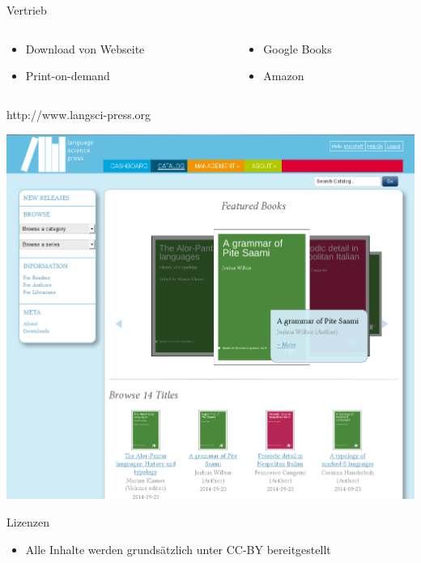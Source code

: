 \documentclass[final]{beamer}
\begin{document}
\begin{frame}{}
\begin{columns}[t]
\begin{column}{.45\linewidth}
    \begin{block}{Vertrieb}
      \begin{columns}
\begin{column}{.48\textwidth}
      \begin{itemize}
      \item Download von Webseite 
      \item Print-on-demand 
      \end{itemize}
\end{column}
\begin{column}{.48\textwidth}
      \begin{itemize}
      \item Google Books 
      \item Amazon
      \end{itemize}
\end{column}
\end{columns}

       
    \end{block}

    \begin{block}{http://www.langsci-press.org}
      \begin{center}
      \includegraphics[width=.8\linewidth]{webseite.png}
       
      \end{center} 
    \end{block}

    \begin{block}{Lizenzen}
      \begin{itemize}
       \item Alle Inhalte werden grunds{\"a}tzlich unter CC-BY bereitgestellt
      \end{itemize}
    \end{block}




\end{column}
\end{columns}
\end{frame}
\end{document}
